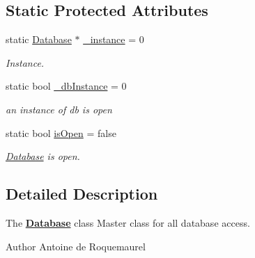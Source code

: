 \subsection*{Static Protected Attributes}
\begin{DoxyCompactItemize}
\item 
\hypertarget{classDatabases_1_1Database_a5f3ca7a29b769615feeac1c8b12f9a7e}{static \hyperlink{classDatabases_1_1Database}{Database} $\ast$ \hyperlink{classDatabases_1_1Database_a5f3ca7a29b769615feeac1c8b12f9a7e}{\-\_\-instance} = 0}\label{classDatabases_1_1Database_a5f3ca7a29b769615feeac1c8b12f9a7e}

\begin{DoxyCompactList}\small\item\em Instance. \end{DoxyCompactList}\item 
\hypertarget{classDatabases_1_1Database_a3bf8253398401fac46f74be67181877a}{static bool \hyperlink{classDatabases_1_1Database_a3bf8253398401fac46f74be67181877a}{\-\_\-db\-Instance} = 0}\label{classDatabases_1_1Database_a3bf8253398401fac46f74be67181877a}

\begin{DoxyCompactList}\small\item\em an instance of db is open \end{DoxyCompactList}\item 
\hypertarget{classDatabases_1_1Database_abdde0f6fbef7f4d7353acda867f01ca0}{static bool \hyperlink{classDatabases_1_1Database_abdde0f6fbef7f4d7353acda867f01ca0}{is\-Open} = false}\label{classDatabases_1_1Database_abdde0f6fbef7f4d7353acda867f01ca0}

\begin{DoxyCompactList}\small\item\em \hyperlink{classDatabases_1_1Database}{Database} is open. \end{DoxyCompactList}\end{DoxyCompactItemize}


\subsection{Detailed Description}
The {\bfseries \hyperlink{classDatabases_1_1Database}{Database}} class Master class for all database access. 

\begin{DoxyAuthor}{Author}
Antoine de Roquemaurel 
\end{DoxyAuthor}


